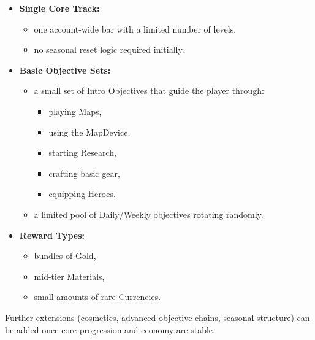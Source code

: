 \begin{itemize}
	\item \textbf{Single Core Track:}
	\begin{itemize}
		\item one account-wide bar with a limited number of levels,
		\item no seasonal reset logic required initially.
	\end{itemize}
	\item \textbf{Basic Objective Sets:}
	\begin{itemize}
		\item a small set of Intro Objectives that guide the player through:
		\begin{itemize}
			\item playing Maps,
			\item using the MapDevice,
			\item starting Research,
			\item crafting basic gear,
			\item equipping Heroes.
		\end{itemize}
		\item a limited pool of Daily/Weekly objectives rotating randomly.
	\end{itemize}
	\item \textbf{Reward Types:}
	\begin{itemize}
		\item bundles of Gold,
		\item mid-tier Materials,
		\item small amounts of rare Currencies.
	\end{itemize}
\end{itemize}

Further extensions (cosmetics, advanced objective chains, seasonal structure) can be added once core progression and economy are stable.
